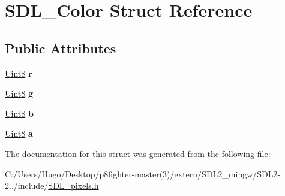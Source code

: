\hypertarget{struct_s_d_l___color}{}\section{S\+D\+L\+\_\+\+Color Struct Reference}
\label{struct_s_d_l___color}
\subsection*{Public Attributes}
\begin{DoxyCompactItemize}
\item 
\mbox{\label{struct_s_d_l___color_a0bb975b6829524133fdd3c6060cfa63d}} 
\hyperlink{_s_d_l__stdinc_8h_a2944638813a090aa23e62f4da842c3e2}{Uint8} {\bfseries r}
\item 
\mbox{\label{struct_s_d_l___color_ae29d881bf740cfa7078b36e07f85d298}} 
\hyperlink{_s_d_l__stdinc_8h_a2944638813a090aa23e62f4da842c3e2}{Uint8} {\bfseries g}
\item 
\mbox{\label{struct_s_d_l___color_a3b79a27e0414049559aa5bcf241dedd3}} 
\hyperlink{_s_d_l__stdinc_8h_a2944638813a090aa23e62f4da842c3e2}{Uint8} {\bfseries b}
\item 
\mbox{\label{struct_s_d_l___color_ac497ba67af6ecb4d51bdd0945b314526}} 
\hyperlink{_s_d_l__stdinc_8h_a2944638813a090aa23e62f4da842c3e2}{Uint8} {\bfseries a}
\end{DoxyCompactItemize}


The documentation for this struct was generated from the following file\+:\begin{DoxyCompactItemize}
\item 
C\+:/\+Users/\+Hugo/\+Desktop/p8fighter-\/master(3)/extern/\+S\+D\+L2\+\_\+mingw/\+S\+D\+L2-\/2../include/\hyperlink{_s_d_l__pixels_8h}{S\+D\+L\+\_\+pixels.\+h}\end{DoxyCompactItemize}
